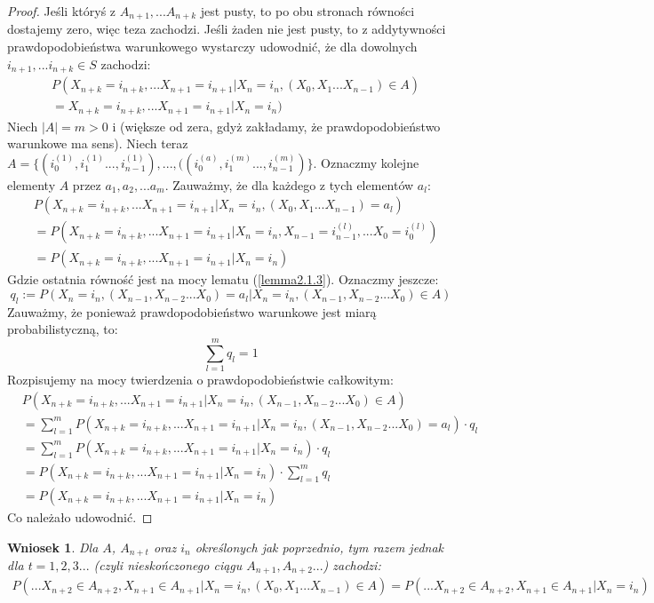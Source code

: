 \documentclass[a4paper]{article}
\theoremstyle{defn}
\theoremstyle{theorem}
\theoremstyle{lemma}
\theoremstyle{cor}
\newtheorem{cor}[defn]{Wniosek}
\theoremstyle{fact}
\begin{document}
\begin{proof}
Jeśli któryś z $A_{n+1}, ... A_{n+k}$ jest pusty, to po obu stronach równości dostajemy zero, więc teza zachodzi. Jeśli żaden nie jest pusty, to z addytywności prawdopodobieństwa warunkowego wystarczy udowodnić, że dla dowolnych $i_{n+1}, ... i_{n+k} \in S$ zachodzi:
\begin{align*}
&P(X_{n+k} = i_{n+k}, ...X_{n+1} = i_{n+1} |X_n = i_n, (X_{0}, X_{1} ... X_{n-1}) \in A)\\
&= X_{n+k} = i_{n+k}, ...X_{n+1} = i_{n+1} |X_n = i_n)
\end{align*}
Niech $|A| = m > 0$ i (większe od zera, gdyż zakładamy, że prawdopodobieństwo warunkowe ma sens). Niech teraz $A = \{(i_0^{(1)}, i_1^{(1)}..., i_{n-1}^{(1)}), ..., ((i_0^{(a)}, i_1^{(m)}..., i_{n-1}^{(m)})\}$. Oznaczmy kolejne elementy $A$ przez $a_1, a_2, ... a_m$.
Zauważmy, że dla każdego z tych elementów $a_l$:
\begin{align*}
    &P(X_{n+k} = i_{n+k}, ...X_{n+1} = i_{n+1} |X_n = i_n, (X_{0}, X_{1} ... X_{n-1}) = a_l) \\
    &= P(X_{n+k} = i_{n+k}, ...X_{n+1} = i_{n+1} |X_n = i_n, X_{n-1} = i_{n-1}^{(l)}, ... X_0 = i_{0}^{(l)})\\
    &= P(X_{n+k} = i_{n+k}, ...X_{n+1} = i_{n+1} |X_n = i_n)
\end{align*}
Gdzie ostatnia równość jest na mocy lematu (\ref{lemma2.1.3}). Oznaczmy jeszcze:
$$ q_l :=P(X_n = i_n, (X_{n-1}, X_{n-2} ... X_0) = a_l|X_n = i_n, (X_{n-1}, X_{n-2} ... X_0) \in A)$$
Zauważmy, że ponieważ prawdopodobieństwo warunkowe jest miarą probabilistyczną, to:
$$\sum\limits_{l = 1}^m q_l = 1$$
Rozpisujemy na mocy twierdzenia o prawdopodobieństwie całkowitym:
\begin{align*}
    &P(X_{n+k} = i_{n+k}, ...X_{n+1} = i_{n+1} |X_n = i_n, (X_{n-1}, X_{n-2} ... X_0) \in A) \\
    &= \sum\limits_{l = 1}^m  P(X_{n+k} = i_{n+k}, ...X_{n+1} = i_{n+1} |X_n = i_n, (X_{n-1}, X_{n-2} ... X_0) = a_l)\cdot q_l\\
    &= \sum\limits_{l = 1}^m  P(X_{n+k} = i_{n+k}, ...X_{n+1} = i_{n+1} |X_n = i_n)\cdot q_l\\
    &= P(X_{n+k} = i_{n+k}, ...X_{n+1} = i_{n+1} |X_n = i_n) \cdot \sum\limits_{l = 1}^m q_l \\
    &= P(X_{n+k} = i_{n+k}, ...X_{n+1} = i_{n+1} |X_n = i_n)
\end{align*}
Co należało udowodnić.
\end{proof}
\begin{cor}
Dla $A$, $A_{n+t}$ oraz $i_n$ określonych jak poprzednio, tym razem jednak dla $t = 1,2,3...$ (czyli nieskończonego ciągu $A_{n+1}, A_{n+2}...$) zachodzi:
\begin{align*}
P(...X_{n+2} \in A_{n+2}, X_{n+1} \in A_{n+1}|X_n = i_n, (X_{0}, X_{1} ... X_{n-1}) \in A) = P(...X_{n+2} \in A_{n+2}, X_{n+1} \in A_{n+1}|X_n = i_n)
\end{align*}
\end{cor}\label{cor2.1.5}
\end{document}
